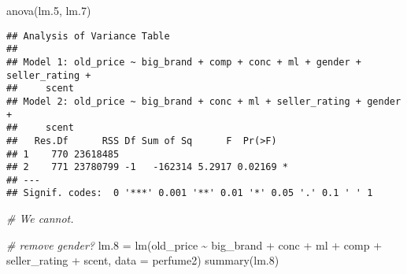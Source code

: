 \documentclass[
]{article}
\newenvironment{Shaded}{\begin{snugshade}}{\end{snugshade}}
\newcommand{\AttributeTok}[1]{\textcolor[rgb]{0.77,0.63,0.00}{#1}}
\newcommand{\CommentTok}[1]{\textcolor[rgb]{0.56,0.35,0.01}{\textit{#1}}}
\newcommand{\FloatTok}[1]{\textcolor[rgb]{0.00,0.00,0.81}{#1}}
\newcommand{\FunctionTok}[1]{\textcolor[rgb]{0.00,0.00,0.00}{#1}}
\newcommand{\NormalTok}[1]{#1}
\newcommand{\OtherTok}[1]{\textcolor[rgb]{0.56,0.35,0.01}{#1}}
\newcommand{\SpecialCharTok}[1]{\textcolor[rgb]{0.00,0.00,0.00}{#1}}
\begin{document}
\begin{Shaded}
\begin{Highlighting}[]
\FunctionTok{anova}\NormalTok{(lm}\FloatTok{.5}\NormalTok{, lm}\FloatTok{.7}\NormalTok{)}
\end{Highlighting}
\end{Shaded}

\begin{verbatim}
## Analysis of Variance Table
## 
## Model 1: old_price ~ big_brand + comp + conc + ml + gender + seller_rating + 
##     scent
## Model 2: old_price ~ big_brand + conc + ml + seller_rating + gender + 
##     scent
##   Res.Df      RSS Df Sum of Sq      F  Pr(>F)  
## 1    770 23618485                              
## 2    771 23780799 -1   -162314 5.2917 0.02169 *
## ---
## Signif. codes:  0 '***' 0.001 '**' 0.01 '*' 0.05 '.' 0.1 ' ' 1
\end{verbatim}

\begin{Shaded}
\begin{Highlighting}[]
\CommentTok{\# We cannot.}
\end{Highlighting}
\end{Shaded}

\begin{Shaded}
\begin{Highlighting}[]
\CommentTok{\# remove gender?}
\NormalTok{lm}\FloatTok{.8} \OtherTok{=} \FunctionTok{lm}\NormalTok{(old\_price }\SpecialCharTok{\textasciitilde{}}\NormalTok{ big\_brand }\SpecialCharTok{+}
\NormalTok{            conc }\SpecialCharTok{+}\NormalTok{ ml }\SpecialCharTok{+}\NormalTok{ comp }\SpecialCharTok{+}\NormalTok{ seller\_rating }\SpecialCharTok{+}
\NormalTok{            scent, }\AttributeTok{data =}\NormalTok{ perfume2)}
\FunctionTok{summary}\NormalTok{(lm}\FloatTok{.8}\NormalTok{)}
\end{Highlighting}
\end{Shaded}
\end{document}
